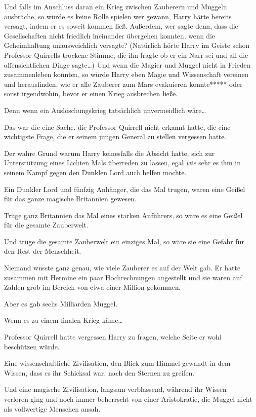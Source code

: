 {Und falls im Anschluss daran ein Krieg zwischen Zauberern und Muggeln ausbräche, so würde es keine Rolle spielen wer gewann, Harry hätte bereits versagt, indem er es soweit kommen ließ. Außerdem, wer sagte denn, dass die Gesellschaften nicht friedlich ineinander übergehen konnten, wenn die Geheimhaltung unausweichlich versagte? (Natürlich hörte Harry im Geiste schon Professor Quirrells trockene Stimme, die ihn fragte ob er ein Narr sei und all die offensichtlichen Dinge sagte…) Und wenn die Magier und Muggel nicht in Frieden zusammenleben konnten, so würde Harry eben Magie und Wissenschaft vereinen und herausfinden, wie er alle Zauberer zum Mars evakuieren konnte***** oder sonst irgendwohin, bevor er einen Krieg ausbrechen ließe.

Denn wenn ein Auslöschungskrieg tatsächlich unvermeidlich wäre…

Das war die eine Sache, die Professor Quirrell nicht erkannt hatte, die eine wichtigste Frage, die er seinem jungen General zu stellen vergessen hatte.

Der wahre Grund warum Harry keinesfalls die Absicht hatte, sich zur Unterstützung eines Lichten Mals überreden zu lassen, egal \emph{wie} sehr es ihm in seinem Kampf gegen den Dunklen Lord auch helfen mochte.

Ein Dunkler Lord und fünfzig Anhänger, die das Mal trugen, waren eine Geißel für das ganze magische Britannien gewesen.

Trüge ganz Britannien das Mal eines starken Anführers, so wäre es eine Geißel für die gesamte Zauberwelt.

Und trüge die gesamte Zauberwelt ein einziges Mal, so wäre sie eine Gefahr für den Rest der Menschheit.

Niemand wusste ganz genau, wie viele Zauberer es auf der Welt gab. Er hatte zusammen mit Hermine ein paar Hochrechnungen angestellt und sie waren auf Zahlen grob im Bereich von etwa einer Million gekommen.

Aber es gab sechs Milliarden Muggel.

Wenn es zu einem finalen Krieg käme…

Professor Quirrell hatte vergessen Harry zu fragen, welche Seite er wohl beschützen würde.

Eine wissenschaftliche Zivilisation, den Blick zum Himmel gewandt in dem Wissen, dass es ihr Schicksal war, nach den Sternen zu greifen.

Und eine magische Zivilisation, langsam verblassend, während ihr Wissen verloren ging und noch immer beherrscht von einer Aristokratie, die Muggel nicht als vollwertige Menschen ansah.

}
